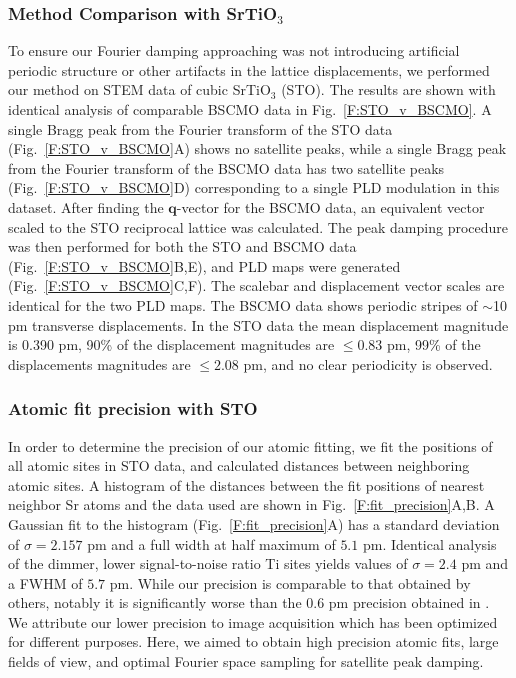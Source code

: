 \documentclass[12pt]{article}
\begin{document}
\subsubsection*{Method Comparison with SrTiO$_{3}$}
To ensure our Fourier damping approaching was not introducing artificial periodic structure or other artifacts in the lattice displacements, we performed our method on STEM data of cubic SrTiO$_{3}$ (STO).
The results are shown with identical analysis of comparable BSCMO data in Fig.~\ref{F:STO_v_BSCMO}.
A single Bragg peak from the Fourier transform of the STO data (Fig.~\ref{F:STO_v_BSCMO}A) shows no satellite peaks, while a single Bragg peak from the Fourier transform of the BSCMO data has two satellite peaks (Fig.~\ref{F:STO_v_BSCMO}D) corresponding to a single PLD modulation in this dataset.
After finding the $\mathbf{q}$-vector for the BSCMO data, an equivalent vector scaled to the STO reciprocal lattice was calculated.
The peak damping procedure was then performed for both the STO and BSCMO data (Fig.~\ref{F:STO_v_BSCMO}B,E), and PLD maps were generated (Fig.~\ref{F:STO_v_BSCMO}C,F).
The scalebar and displacement vector scales are identical for the two PLD maps.
The BSCMO data shows periodic stripes of $\sim$10 pm transverse displacements. 
In the STO data the mean displacement magnitude is 0.390 pm, 90\% of the displacement magnitudes are $\leq 0.83$ pm, 99\% of the displacements magnitudes are $\leq 2.08$ pm, and no clear periodicity is observed.



\subsubsection*{Atomic fit precision with STO}

In order to determine the precision of our atomic fitting, we fit the positions of all atomic sites in STO data, and calculated distances between neighboring atomic sites.
A histogram of the distances between the fit positions of nearest neighbor Sr atoms and the data used are shown in Fig.~\ref{F:fit_precision}A,B.
A Gaussian fit to the histogram (Fig.~\ref{F:fit_precision}A) has a standard deviation of $\sigma=2.157$ pm and a full width at half maximum of $5.1$ pm.
Identical analysis of the dimmer, lower signal-to-noise ratio Ti sites yields values of $\sigma=2.4$ pm and a FWHM of $5.7$ pm.
While our precision is comparable to that obtained by others, notably it is significantly worse than the 0.6 pm precision obtained in \cite{Yankovich2014}.
We attribute our lower precision to image acquisition which has been optimized for different purposes.
Here, we aimed to obtain high precision atomic fits, large fields of view, and optimal Fourier space sampling for satellite peak damping.
\end{document}
